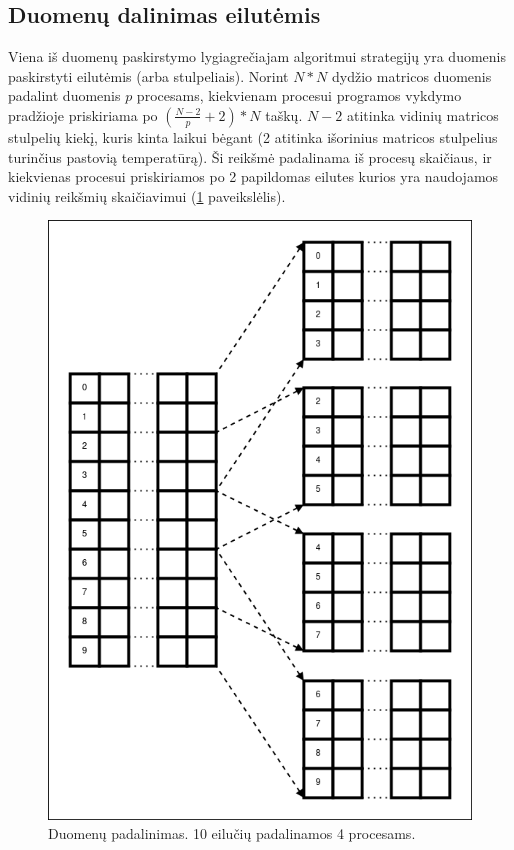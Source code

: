 \documentclass{VUMIFPSbakalaurinis}
\begin{document}
\subsection{Duomenų dalinimas eilutėmis}

Viena iš duomenų paskirstymo lygiagrečiajam algoritmui strategijų yra duomenis paskirstyti eilutėmis (arba stulpeliais).
Norint $N*N$ dydžio matricos duomenis padalint duomenis $p$ procesams, kiekvienam procesui programos vykdymo pradžioje priskiriama po  $(\frac{N-2}{p}+2) * N$ taškų. 
$N-2$ atitinka vidinių matricos stulpelių kiekį, kuris kinta laikui bėgant (2 atitinka išorinius matricos stulpelius turinčius pastovią temperatūrą). 
Ši reikšmė padalinama iš procesų skaičiaus, ir kiekvienas procesui priskiriamos po 2 papildomas eilutes kurios yra naudojamos vidinių reikšmių skaičiavimui (\ref{img:distribution} paveikslėlis).
\begin{figure}[H]
    \centering
    \includegraphics[scale=0.4]{img/distribution.png}
    \caption{Duomenų padalinimas. 10 eilučių padalinamos 4 procesams.}
    \label{img:distribution}
\end{figure}
\end{document}
